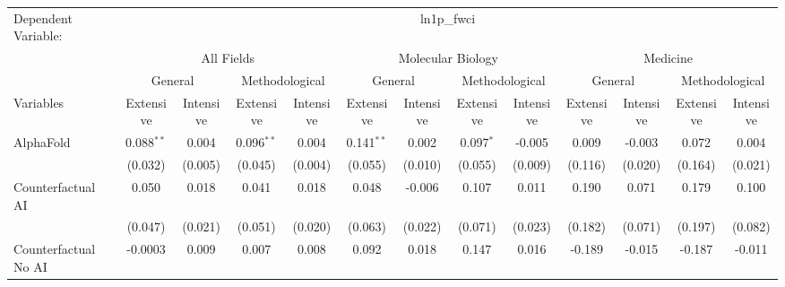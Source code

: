 \begingroup
\centering
\begin{tabular}{lcccccccccccc}
   \tabularnewline \midrule \midrule
   Dependent Variable: & \multicolumn{12}{c}{ln1p\_fwci}\\
 & \multicolumn{4}{c}{All Fields} & \multicolumn{4}{c}{Molecular Biology} & \multicolumn{4}{c}{Medicine} \\
\cmidrule(lr){2-5} \cmidrule(lr){6-9} \cmidrule(lr){10-13}
 & \multicolumn{2}{c}{General} & \multicolumn{2}{c}{Methodological} & \multicolumn{2}{c}{General} & \multicolumn{2}{c}{Methodological} & \multicolumn{2}{c}{General} & \multicolumn{2}{c}{Methodological} \\
\cmidrule(lr){2-3} \cmidrule(lr){4-5} \cmidrule(lr){6-7} \cmidrule(lr){8-9} \cmidrule(lr){10-11} \cmidrule(lr){12-13}
Variables & \multicolumn{1}{c}{Extensive} & \multicolumn{1}{c}{Intensive} & \multicolumn{1}{c}{Extensive} & \multicolumn{1}{c}{Intensive} & \multicolumn{1}{c}{Extensive} & \multicolumn{1}{c}{Intensive} & \multicolumn{1}{c}{Extensive} & \multicolumn{1}{c}{Intensive} & \multicolumn{1}{c}{Extensive} & \multicolumn{1}{c}{Intensive} & \multicolumn{1}{c}{Extensive} & \multicolumn{1}{c}{Intensive} \\
\cmidrule(lr){1-1}\cmidrule(lr){2-2} \cmidrule(lr){3-3} \cmidrule(lr){4-4} \cmidrule(lr){5-5} \cmidrule(lr){6-6} \cmidrule(lr){7-7} \cmidrule(lr){8-8} \cmidrule(lr){9-9} \cmidrule(lr){10-10} \cmidrule(lr){11-11} \cmidrule(lr){12-12} \cmidrule(lr){13-13}
   AlphaFold                                & 0.088$^{**}$ & 0.004    & 0.096$^{**}$ & 0.004    & 0.141$^{**}$ & 0.002    & 0.097$^{*}$ & -0.005   & 0.009   & -0.003  & 0.072   & 0.004\\   
                                            & (0.032)      & (0.005)  & (0.045)      & (0.004)  & (0.055)      & (0.010)  & (0.055)     & (0.009)  & (0.116) & (0.020) & (0.164) & (0.021)\\   
   Counterfactual AI                        & 0.050        & 0.018    & 0.041        & 0.018    & 0.048        & -0.006   & 0.107       & 0.011    & 0.190   & 0.071   & 0.179   & 0.100\\   
                                            & (0.047)      & (0.021)  & (0.051)      & (0.020)  & (0.063)      & (0.022)  & (0.071)     & (0.023)  & (0.182) & (0.071) & (0.197) & (0.082)\\   
   Counterfactual No AI                     & -0.0003      & 0.009    & 0.007        & 0.008    & 0.092        & 0.018    & 0.147       & 0.016    & -0.189  & -0.015  & -0.187  & -0.011\\   

\end{tabular}
